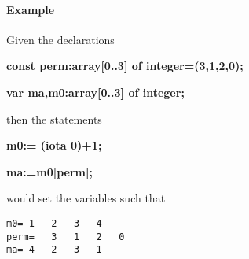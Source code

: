 \paragraph{Example}

Given the declarations

\textbf{const perm:array{[}0..3{]} of integer=(3,1,2,0);}

\textbf{var ma,m0:array{[}0..3{]} of integer; }

then the statements

\textbf{m0:= (iota 0)+1;}


\textbf{ma:=m0{[}perm{]}; }



would set the variables such that 

\begin{verbatim}
m0=	1 	2 	3 	4
perm=	3	1	2	0
ma=	4	2	3	1
\end{verbatim}



